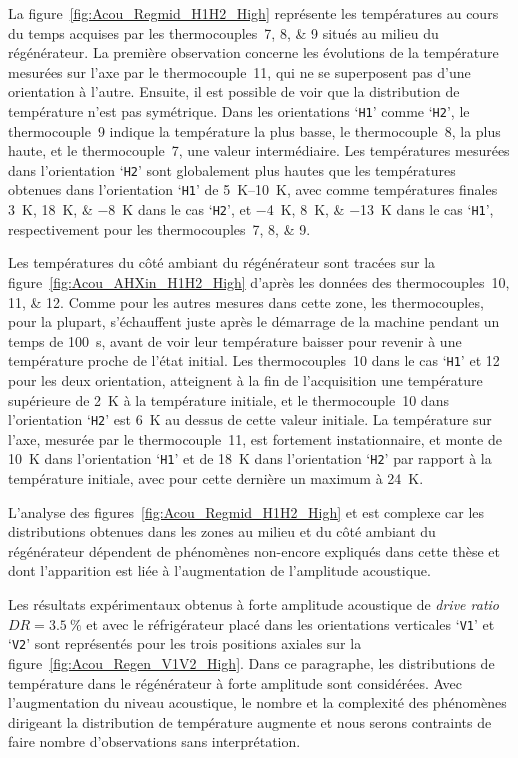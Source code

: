 La figure~\ref{fig:Acou_Regmid_H1H2_High} représente les températures au cours du temps acquises par les thermocouples~\numlist{7;8;9} situés au milieu du régénérateur. La première observation concerne les évolutions de la température mesurées sur l'axe par le thermocouple~\num{11}, qui ne se superposent pas d'une orientation à l'autre. Ensuite, il est possible de voir que la distribution de température n'est pas symétrique. Dans les orientations `\texttt{H1}' comme `\texttt{H2}', le thermocouple~\num{9} indique la température la plus basse, le thermocouple~\num{8}, la plus haute, et le thermocouple~\num{7}, une valeur intermédiaire. Les températures mesurées dans l'orientation `\texttt{H2}' sont globalement plus hautes que les températures obtenues dans l'orientation `\texttt{H1}'  de \qtyrange{5}{10}{\kelvin}, avec comme températures finales \qtylist{3;18;-8}{\kelvin} dans le cas `\texttt{H2}', et \qtylist{-4;8;-13}{\kelvin} dans le cas `\texttt{H1}', respectivement pour les thermocouples~\numlist{7;8;9}.\medskip


Les températures du côté ambiant du régénérateur sont tracées sur la figure~\ref{fig:Acou_AHXin_H1H2_High} d'après les données des thermocouples~\numlist{10;11;12}. Comme pour les autres mesures dans cette zone, les thermocouples, pour la plupart, s'échauffent juste après le démarrage de la machine pendant un temps de \qty{100}{\second}, avant de voir leur température baisser pour revenir à une température proche de l'état initial. Les thermocouples~\num{10} dans le cas `\texttt{H1}' et \num{12} pour les deux orientation, atteignent à la fin de l'acquisition une température supérieure de \qty{2}{\kelvin} à la température initiale, et le thermocouple~\num{10} dans l'orientation `\texttt{H2}' est \qty{6}{\kelvin} au dessus de cette valeur initiale. La température sur l'axe, mesurée par le thermocouple~\num{11}, est fortement instationnaire, et monte de \qty{10}{\kelvin} dans l'orientation `\texttt{H1}' et de \qty{18}{\kelvin} dans l'orientation `\texttt{H2}' par rapport à la température initiale, avec pour cette dernière un maximum à \qty{24}{\kelvin}.\medskip

L'analyse des figures~\ref{fig:Acou_Regmid_H1H2_High} et  est complexe car les distributions obtenues dans les zones au milieu et du côté ambiant du régénérateur dépendent de phénomènes non-encore expliqués dans cette thèse et dont l'apparition est liée à l'augmentation de l'amplitude acoustique.\bigskip

Les résultats expérimentaux obtenus à forte amplitude acoustique de \textit{drive ratio} $DR=\qty{3.5}{\percent}$ et avec le réfrigérateur placé dans les orientations verticales `\texttt{V1}' et `\texttt{V2}' sont représentés pour les trois positions axiales sur la figure~\ref{fig:Acou_Regen_V1V2_High}. Dans ce paragraphe, les distributions de température dans le régénérateur à forte amplitude sont considérées. Avec l'augmentation du niveau acoustique, le nombre et la complexité des phénomènes dirigeant la distribution de température augmente et nous serons contraints de faire nombre d'observations sans interprétation.

